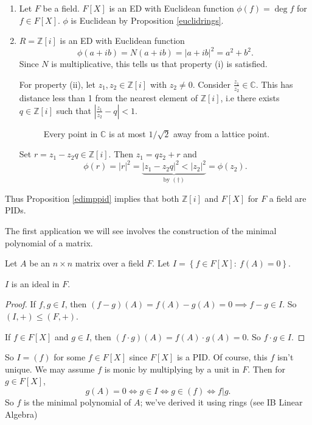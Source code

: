 \documentclass[egregdoesnotlikesansseriftitles,a4paper]{scrartcl}
\begin{document}
\begin{example*}
      \begin{enumerate}
            \item Let $F$ be a field. $F[X]$ is an ED with Euclidean function $\phi (f)=\operatorname{deg} f$ for $f \in F[X]$. $\phi$ is Euclidean by Proposition \ref{euclidrings}.
            \item $R=\mathbb{Z}[i]$ is an ED with Euclidean function 
            \begin{equation}\tag{$\dagger$}
                  \phi (a+ib )=N (a+ib)= \left|a+ib \right|^2 =a^2+b^2. 
            \end{equation}
             Since $N$ is multiplicative, this tells us that property (i) is satisfied. 

            For property (ii), let $z_1 , z_2 \in \mathbb{Z}[i]$ with $z_2 \neq 0$. Consider $\frac{z_1}{z_2 } \in \mathbb{C}$. This has distance less than 1 from the nearest element of $\mathbb{Z}[i]$, i.e there exists $q \in \mathbb{Z}[i]$ such that $\left|\frac{z_1}{z_2 }-q\right|<1$.
            \begin{figure}[H]
                  \centering
                  \caption{Every point in $\mathbb{C}$ is at most $1/\sqrt{2}$ away from a lattice point.}
            \end{figure}
            Set $r=z_1 -z_2 q \in \mathbb{Z}[i]$. Then $z_1 =qz_2 +r$ and \[
            \phi (r)=\left|r\right|^2= \underbrace{\left|z_1 -z_2 q\right|^2<\left|z_2 \right|^2 }_{\text{by } (\dagger)} =\phi (z_2 )
            .\]
      \end{enumerate}
      Thus Proposition \ref{edimppid} implies that both $\mathbb{Z}[i]$ and $F[X]$ for $F$ a field are PIDs.
\end{example*}
The first application we will see involves the construction of the minimal polynomial of a matrix.
\begin{example*}
       Let $A$ be an $n \times n$ matrix over a field $F$. Let $I=\left\{f \in F[X]: \ f (A)=0\right\}$. 
       \begin{claim}
             $I$ is an ideal in $F$.
       \end{claim}
       \begin{proof}
              If $f,g \in I$, then $(f-g)(A)=f (A)- g (A)=0 \implies f-g \in I$. So $(I,+)\leq (F,+)$. 
              
              If $f \in F[X]$ and $g \in I$, then $(f \cdot g)(A)=f (A)\cdot g (A)=0$. So $f \cdot g \in I$.
       \end{proof}
       So $I = (f)$ for some $f \in F[X]$ since $F[X]$ is a PID. Of course, this $f$ isn't unique. We may assume $f$ is monic by multiplying by a unit in $F$. Then for $g \in F[X]$, \[
            g (A)=0 \iff g \in I \iff g \in (f) \iff f|g
       .\] So $f$ is the minimal polynomial of $A$; we've derived it using rings (see IB Linear Algebra)
\end{example*}
\end{document}
